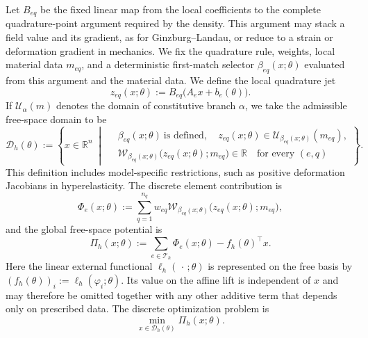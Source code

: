 Let $B_{eq}$ be the fixed linear map from the local coefficients to the complete
quadrature-point argument required by the density. This argument may stack a
field value and its gradient, as for Ginzburg--Landau, or reduce to a strain or
deformation gradient in mechanics. We fix the quadrature rule, weights, local
material data $m_{eq}$, and a deterministic first-match selector
$\beta_{eq}(x;\theta)$ evaluated from this argument and the material data. We
define the local quadrature jet
\begin{equation}
  z_{eq}(x;\theta)
  :=B_{eq}\bigl(A_e x+b_e(\theta)\bigr).
  \label{eq:quadrature-jet}
\end{equation}
If $\mathcal{U}_{\alpha}(m)$ denotes the domain of constitutive branch
$\alpha$, we take the admissible free-space domain to be
\begin{equation}
  \mathcal{D}_h(\theta)
  :=\left\{x\in\mathbb{R}^n\;\middle|\;
  \begin{aligned}
    &\beta_{eq}(x;\theta)\ \text{is defined},\quad
      z_{eq}(x;\theta)
      \in\mathcal{U}_{\beta_{eq}(x;\theta)}(m_{eq}),\\
    &\mathcal{W}_{\beta_{eq}(x;\theta)}
      \bigl(z_{eq}(x;\theta);m_{eq}\bigr)\in\mathbb{R}
      \quad\text{for every }(e,q)
  \end{aligned}\right\}.
  \label{eq:admissible-domain}
\end{equation}
This definition includes model-specific restrictions, such as positive
deformation Jacobians in hyperelasticity. The discrete element contribution is
\begin{equation}
  \Phi_e(x;\theta)
  :=\sum_{q=1}^{n_q}w_{eq}
  \mathcal{W}_{\beta_{eq}(x;\theta)}
  \bigl(z_{eq}(x;\theta);m_{eq}\bigr),
  \label{eq:element-quadrature-potential}
\end{equation}
and the global free-space potential is
\begin{equation}
  \Pi_h(x;\theta)
  :=\sum_{e\in\mathcal{T}_h}\Phi_e(x;\theta)-f_h(\theta)^\top x.
  \label{eq:generic-potential}
\end{equation}
Here the linear external functional $\ell_h(\,\cdot\,;\theta)$ is represented
on the free basis by
$(f_h(\theta))_i:=\ell_h(\varphi_i;\theta)$. Its value on the affine lift is
independent of $x$ and may therefore be omitted together with any other
additive term that depends only on prescribed data. The discrete optimization
problem is
\begin{equation}
  \min_{x\in\mathcal{D}_h(\theta)}\Pi_h(x;\theta).
  \label{eq:discrete-optimization-problem}
\end{equation}
